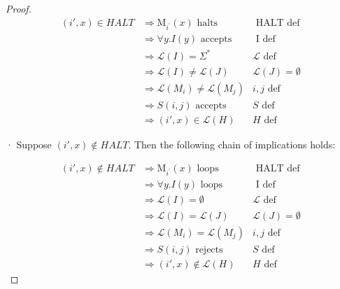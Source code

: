 \documentclass[10pt]{article}
\begin{document}
\begin{enumerate}[label={}]
\begin{proof}
                  $$
                        \begin{array}{rlr}
                              (i', x) \in H A L T & \Longrightarrow \text{M}_{i^{\prime}}(x) \text { halts }                    & \text { HALT def }        \\
                                                  & \Longrightarrow \forall y. I(y) \text { accepts }                           & \text { I def }           \\
                                                  & \Longrightarrow \mathcal{L}(I)=\Sigma^*                                     & \mathcal{L} \text { def } \\
                                                  & \Longrightarrow \mathcal{L}(I) \neq \mathcal{L}(J)                          & \mathcal{L}(J)=\emptyset  \\
                                                  & \Longrightarrow \mathcal{L}\left(M_i\right)\neq \mathcal{L}\left(M_j\right) & i, j \text { def }        \\
                                                  & \Longrightarrow S(i, j) \text { accepts }                                   & S \text { def }           \\
                                                  & \Longrightarrow(i', x) \in \mathcal{L}(H)                                   & H \text { def }
                        \end{array}
                  $$

                  · Suppose $(i', x) \notin H A L T$. Then the following chain of implications holds:

                  $$
                        \begin{array}{rlr}
                              (i', x) \notin H A L T & \Longrightarrow \text{M}_{i^{\prime}}(x) \text { loops }                  & \text { HALT def }        \\
                                                     & \Longrightarrow \forall y . I(y) \text { loops }                          & \text { I def }           \\
                                                     & \Longrightarrow \mathcal{L}(I)=\emptyset                                  & \mathcal{L} \text { def } \\
                                                     & \Longrightarrow \mathcal{L}(I) = \mathcal{L}(J)                           & \mathcal{L}(J)=\emptyset  \\
                                                     & \Longrightarrow \mathcal{L}\left(M_i\right) = \mathcal{L}\left(M_j\right) & i, j \text { def }        \\
                                                     & \Longrightarrow S(i, j) \text { rejects }                                 & S \text { def }           \\
                                                     & \Longrightarrow(i', x) \notin \mathcal{L}(H)                              & H \text { def }
                        \end{array}
                  $$



\end{proof}
\end{enumerate}
\end{document}
